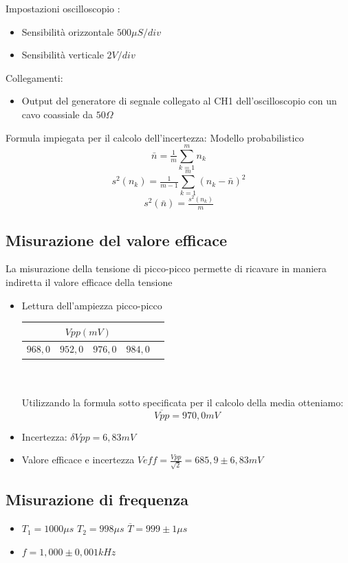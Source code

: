 \documentclass[a4paper]{article}
\begin{document}
Impostazioni oscilloscopio :
\begin{itemize}
\item Sensibilità orizzontale \(500  \mu S/div \)
\item Sensibilità verticale \(2 V/div\)
\end{itemize}

Collegamenti:
\begin{itemize}
\item Output del generatore di segnale collegato al CH1 dell'oscilloscopio con un cavo coassiale da \(50 \Omega\)  
\end{itemize}

Formula impiegata per il calcolo dell’incertezza: Modello probabilistico \[\bar{n} = \tfrac{1}{m}\sum_{k=1}^m n_k \]
\[s^2 (n_k)= \tfrac{1}{m-1}\sum_{k=1}^m (n_k - \bar{n})^2 \] 
\[s^2 (\bar{n}) = \tfrac{s^2 (n_k)}{m}\]

\subsection{Misurazione del valore efficace}

La misurazione della tensione di picco-picco permette di ricavare in maniera indiretta il valore efficace della tensione
\begin{itemize}
\item Lettura dell’ampiezza picco-picco \\ 
    \begin{tabular}{|r|l|l|l|l|}
     \hline
     \multicolumn{4}{|c|}{\(Vpp (mV)\)} \\
     \hline
     \(968,0\) & \(952,0\) & \(976,0\) & \(984,0\) \\
     \hline
   \end{tabular} \\ \\
Utilizzando la formula sotto specificata per il calcolo della media otteniamo:
\[\overline{Vpp}= 970,0 mV\]
\item Incertezza: \(\delta{}  Vpp= 6,83 mV\)
\item Valore efficace e incertezza \(Veff= \tfrac{Vpp}{\sqrt{2}} = 685,9 \pm 6,83 mV \)
\end{itemize}

\subsection{Misurazione di frequenza}
\begin{itemize}
\item \(T_1 = 1000 \mu s\) \(T_2 = 998 \mu s\) \(\overline{T} = 999 \pm 1 \mu s\)
\item \(f= 1,000 \pm 0,001 kHz\)
\end{itemize}
\end{document}
